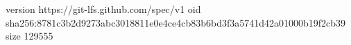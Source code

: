 version https://git-lfs.github.com/spec/v1
oid sha256:8781c3b2d9273abc3018811e0e4ce4cb83b6bd3f3a5741d42a01000b19f2cb39
size 129555
